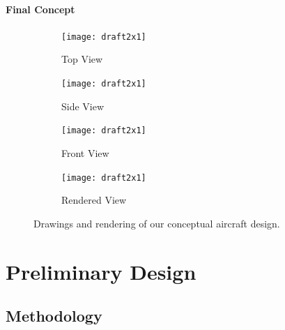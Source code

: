 \documentclass[report]{byu-aero}
\begin{document}
\lipsum[1]


\paragraph{Final Concept}
\label{sssec:finalconcept}

\lipsum[1]

\begin{figure}[h!]
	\centering
	\begin{subfigure}[b]{0.475\textwidth}
		\texttt{[image: draft2x1]}
		\caption{Top View}
		\label{fig:topview}
	\end{subfigure}
	\begin{subfigure}[b]{0.475\textwidth}
		\texttt{[image: draft2x1]}
		\caption{Side View}
		\label{fig:sideview}
	\end{subfigure}
	
	\begin{subfigure}[b]{0.475\textwidth}
		\texttt{[image: draft2x1]}
		\caption{Front View}
		\label{fig:frontview}
	\end{subfigure}
	\begin{subfigure}[b]{0.475\textwidth}
		\texttt{[image: draft2x1]}
		\caption{Rendered View}
		\label{fig:renderedview}
	\end{subfigure}
	\caption{Drawings and rendering of our conceptual aircraft design.}
	\label{fig:prelimdrawings}
\end{figure}



\section{Preliminary Design} %
\label{sec:PreliminaryDesign}


\subsection{Methodology}
\label{ssec:methodology}
\end{document}
